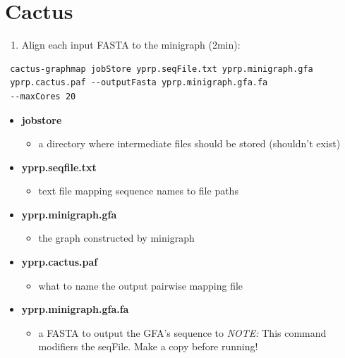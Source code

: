 \documentclass[
]{book}
\providecommand{\tightlist}{%
  \setlength{\itemsep}{0pt}\setlength{\parskip}{0pt}}
\begin{document}
\hypertarget{cactus-1}{%
\section{Cactus}\label{cactus-1}}

\begin{enumerate}
\def\labelenumi{\arabic{enumi}.}
\tightlist
\item
  Align each input FASTA to the minigraph (2min):
\end{enumerate}

\begin{verbatim}
 cactus-graphmap jobStore yprp.seqFile.txt yprp.minigraph.gfa
 yprp.cactus.paf --outputFasta yprp.minigraph.gfa.fa
 --maxCores 20
\end{verbatim}

\begin{itemize}
\tightlist
\item
  \textbf{jobstore}

  \begin{itemize}
  \tightlist
  \item
    a directory where intermediate files should be stored (shouldn't exist)
  \end{itemize}
\item
  \textbf{yprp.seqfile.txt}

  \begin{itemize}
  \tightlist
  \item
    text file mapping sequence names to file paths
  \end{itemize}
\item
  \textbf{yprp.minigraph.gfa}

  \begin{itemize}
  \tightlist
  \item
    the graph constructed by minigraph
  \end{itemize}
\item
  \textbf{yprp.cactus.paf}

  \begin{itemize}
  \tightlist
  \item
    what to name the output pairwise mapping file
  \end{itemize}
\item
  \textbf{yprp.minigraph.gfa.fa}

  \begin{itemize}
  \tightlist
  \item
    a FASTA to output the GFA's sequence to
    \emph{NOTE:} This command modifiers the seqFile. Make a copy before running!
  \end{itemize}
\end{itemize}
\end{document}
